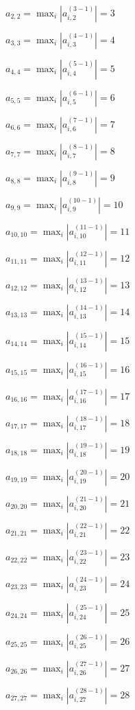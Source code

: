 \documentclass[a4paper,12pt]{article}
\begin{document}
$a _{ 2, 2 } =  \max _i |a _{ i, 2 } ^{ (3 - 1) } | = 3$

$a _{ 3, 3 } =  \max _i |a _{ i, 3 } ^{ (4 - 1) } | = 4$

$a _{ 4, 4 } =  \max _i |a _{ i, 4 } ^{ (5 - 1) } | = 5$

$a _{ 5, 5 } =  \max _i |a _{ i, 5 } ^{ (6 - 1) } | = 6$

$a _{ 6, 6 } =  \max _i |a _{ i, 6 } ^{ (7 - 1) } | = 7$

$a _{ 7, 7 } =  \max _i |a _{ i, 7 } ^{ (8 - 1) } | = 8$

$a _{ 8, 8 } =  \max _i |a _{ i, 8 } ^{ (9 - 1) } | = 9$

$a _{ 9, 9 } =  \max _i |a _{ i, 9 } ^{ (10 - 1) } | = 10$

$a _{ 10, 10 } =  \max _i |a _{ i, 10 } ^{ (11 - 1) } | = 11$

$a _{ 11, 11 } =  \max _i |a _{ i, 11 } ^{ (12 - 1) } | = 12$

$a _{ 12, 12 } =  \max _i |a _{ i, 12 } ^{ (13 - 1) } | = 13$

$a _{ 13, 13 } =  \max _i |a _{ i, 13 } ^{ (14 - 1) } | = 14$

$a _{ 14, 14 } =  \max _i |a _{ i, 14 } ^{ (15 - 1) } | = 15$

$a _{ 15, 15 } =  \max _i |a _{ i, 15 } ^{ (16 - 1) } | = 16$

$a _{ 16, 16 } =  \max _i |a _{ i, 16 } ^{ (17 - 1) } | = 17$

$a _{ 17, 17 } =  \max _i |a _{ i, 17 } ^{ (18 - 1) } | = 18$

$a _{ 18, 18 } =  \max _i |a _{ i, 18 } ^{ (19 - 1) } | = 19$

$a _{ 19, 19 } =  \max _i |a _{ i, 19 } ^{ (20 - 1) } | = 20$

$a _{ 20, 20 } =  \max _i |a _{ i, 20 } ^{ (21 - 1) } | = 21$

$a _{ 21, 21 } =  \max _i |a _{ i, 21 } ^{ (22 - 1) } | = 22$

$a _{ 22, 22 } =  \max _i |a _{ i, 22 } ^{ (23 - 1) } | = 23$

$a _{ 23, 23 } =  \max _i |a _{ i, 23 } ^{ (24 - 1) } | = 24$

$a _{ 24, 24 } =  \max _i |a _{ i, 24 } ^{ (25 - 1) } | = 25$

$a _{ 25, 25 } =  \max _i |a _{ i, 25 } ^{ (26 - 1) } | = 26$

$a _{ 26, 26 } =  \max _i |a _{ i, 26 } ^{ (27 - 1) } | = 27$

$a _{ 27, 27 } =  \max _i |a _{ i, 27 } ^{ (28 - 1) } | = 28$
\end{document}
